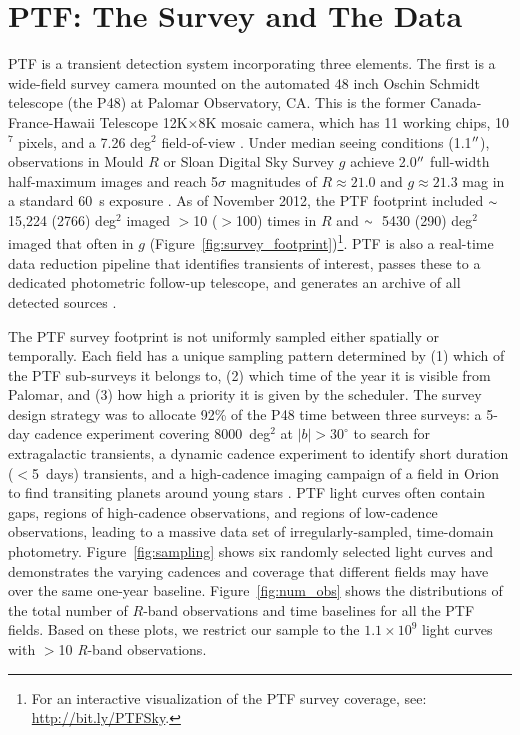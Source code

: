 \documentclass{emulateapj}
\newcommand{\apwsim}{\raisebox{0.2ex}{\scriptsize$\sim$\normalsize}}
\begin{document}
\section{PTF: The Survey and The Data} %
PTF is a transient detection system incorporating three elements. The first is a wide-field survey camera mounted on the automated 48 inch Oschin Schmidt telescope (the P48) at Palomar Observatory, CA. This is the former Canada-France-Hawaii Telescope 12K$\times$8K mosaic camera, which has 11 working chips, 10$^7$ pixels, and a 7.26 deg$^2$ field-of-view \citep{rahmer2008}. Under median seeing conditions (1.1$\mbox{$^{\prime\prime}$}$), observations in Mould $R$ or Sloan Digital Sky Survey \citep[SDSS;][]{york00} $g$ achieve 2.0$\mbox{$^{\prime\prime}$}$ full-width half-maximum images and reach 5$\sigma$ magnitudes of $R \approx 21.0$ and $g \approx 21.3$ mag in a standard 60~s exposure \citep{nick2010}. As of November 2012, the PTF footprint included $\apwsim$15,224 (2766) deg$^2$ imaged $>$10 ($>$100) times in $R$ and $\apwsim$5430 (290) deg$^2$ imaged that often in $g$ (Figure~\ref{fig:survey_footprint})\footnote{For an interactive visualization of the PTF survey coverage, see: \url{http://bit.ly/PTFSky}.}. PTF is also a real-time data reduction pipeline that identifies transients of interest, passes these to a dedicated photometric follow-up telescope, and generates an archive of all detected sources \citep{nick2009,rau2009}.

The PTF survey footprint is not uniformly sampled either spatially or temporally. Each field has a unique sampling pattern determined by (1) which of the PTF sub-surveys it belongs to, (2) which time of the year it is visible from Palomar, and (3) how high a priority it is given by the scheduler. The survey design strategy was to allocate 92\% of the P48 time between three surveys: a 5-day cadence experiment covering 8000~deg$^2$ at $|b|>30^\circ$ to search for extragalactic transients, a dynamic cadence experiment to identify short duration ($<$5~days) transients, and a high-cadence imaging campaign of a field in Orion to find transiting planets around young stars \citep{nick2009}. PTF light curves often contain gaps, regions of high-cadence observations, and regions of low-cadence observations, leading to a massive data set of irregularly-sampled, time-domain photometry. Figure~\ref{fig:sampling} shows six randomly selected light curves and demonstrates the varying cadences and coverage that different fields may have over the same one-year baseline. Figure~\ref{fig:num_obs} shows the distributions of the total number of $R$-band observations and time baselines for all the PTF fields. Based on these plots, we restrict our sample to the \apwsim$1.1\times10^9$ light curves with $>$10 \textit{R}-band observations. %
\end{document}
